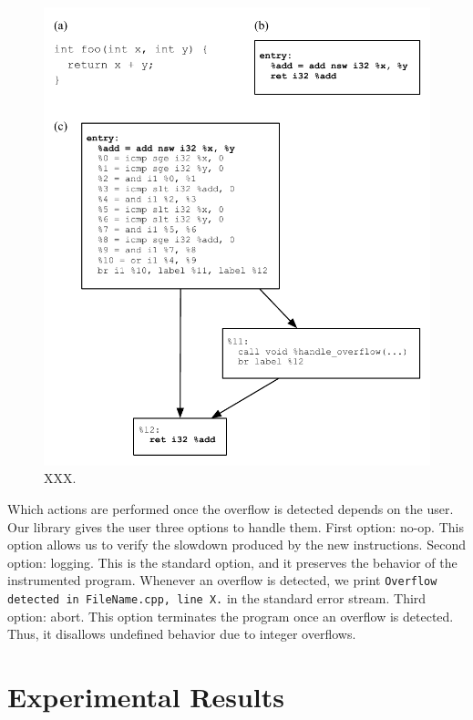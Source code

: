 \documentclass[preprint]{sigplanconf}[10pt]
\begin{document}
\begin{figure}[t!]
\begin{center}
\includegraphics[width=\columnwidth]{images/instrumented_cfg}
\end{center}
\caption{\label{fig:instrumented_cfg}
XXX.}
\end{figure}

Which actions are performed once the overflow is detected depends on the
user.
Our library gives the user three options to handle them. 
First option: no-op.
This option allows us to verify the slowdown produced by the new instructions.
Second option: logging.
This is the standard option, and it preserves the behavior of the instrumented
program.
Whenever an overflow is detected, we print \texttt{Overflow detected in
FileName.cpp, line X.} in the standard error stream.
Third option: abort.
This option terminates the program once an overflow is detected.
Thus, it disallows undefined behavior due to integer overflows.

\section{Experimental Results}
\label{sec:exp}
\end{document}
